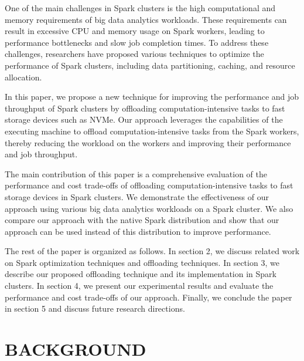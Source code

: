 \documentclass[twocolumn,10pt]{asme2e}
\begin{document}
One of the main challenges in Spark clusters is the high computational and memory requirements of big data analytics workloads. These requirements can result in excessive CPU and memory usage on Spark workers, leading to performance bottlenecks and slow job completion times. To address these challenges, researchers have proposed various techniques to optimize the performance of Spark clusters, including data partitioning, caching, and resource allocation.

In this paper, we propose a new technique for improving the performance and job throughput of Spark clusters by offloading computation-intensive tasks to fast storage devices such as NVMe. Our approach leverages the capabilities of the executing machine to offload computation-intensive tasks from the Spark workers, thereby reducing the workload on the workers and improving their performance and job throughput.

The main contribution of this paper is a comprehensive evaluation of the performance and cost trade-offs of offloading computation-intensive tasks to fast storage devices in Spark clusters. We demonstrate the effectiveness of our approach using various big data analytics workloads on a Spark cluster. We also compare our approach with the native Spark distribution and show that our approach can be used instead of this distribution to improve performance.

The rest of the paper is organized as follows. In section 2, we discuss related work on Spark optimization techniques and offloading techniques. In section 3, we describe our proposed offloading technique and its implementation in Spark clusters. In section 4, we present our experimental results and evaluate the performance and cost trade-offs of our approach. Finally, we conclude the paper in section 5 and discuss future research directions.

\section*{BACKGROUND}

\subsection*{}


\subsubsection*{}
\end{document}
